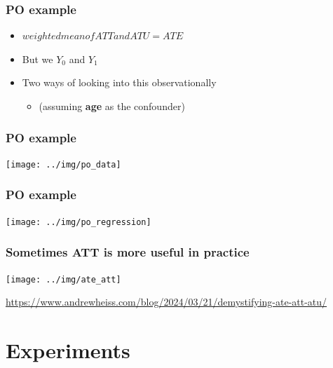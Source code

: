 \documentclass[aspectratio=43]{beamer}
\begin{document}
\begin{frame}
\frametitle{PO example}
\centering

\begin{itemize}
  \item $weighted mean of ATT and ATU = ATE$
  \item But we  $Y_{0}$ and $Y_{1}$
  \item Two ways of looking into this observationally
  \begin{itemize}
    \item (assuming \textbf{age} as the  confounder)
  \end{itemize}
  
\end{itemize}

  
\end{frame}
  
\begin{frame}
\frametitle{PO example}
\centering

\texttt{[image: ../img/po\_data]}

\end{frame}

\begin{frame}
\frametitle{PO example}
\centering

\texttt{[image: ../img/po\_regression]}

\end{frame}
  
\begin{frame}
\frametitle{Sometimes ATT is more useful in practice}
\centering

\texttt{[image: ../img/ate\_att]}

\href{https://www.andrewheiss.com/blog/2024/03/21/demystifying-ate-att-atu/}{\footnotesize https://www.andrewheiss.com/blog/2024/03/21/demystifying-ate-att-atu/}
  

\end{frame}

\section{Experiments}
\end{document}
